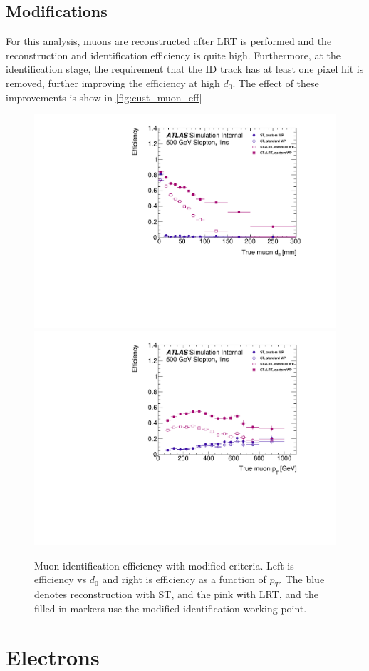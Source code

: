 \subsection{Modifications}
\label{sec:mu_reco_mods}

For this analysis, muons are reconstructed after \ac{LRT} is performed and the reconstruction and identification efficiency is quite high. Furthermore, at the identification stage, the requirement that the \ac{ID} track has at least one pixel hit is removed, further improving the efficiency at high $d_{0}$. The effect of these improvements is show in \autoref{fig:cust_muon_eff}


\begin{figure}[htbp]
\centering
\includegraphics[width=.48\textwidth]{figures/EventReconstruction/wp_m_d0_all_wip.pdf}
\includegraphics[width=.48\textwidth]{figures/EventReconstruction/wp_m_pt_all_wip.pdf}
\caption{Muon identification efficiency with modified criteria. Left is efficiency vs $d_{0}$ and right is efficiency as a function of $p_{T}$. The blue denotes reconstruction with \ac{ST}, and the pink with \ac{LRT}, and the filled in markers use the modified identification working point.}
\label{fig:cust_muon_eff}
\end{figure}



\section{Electrons}
\label{sec:elecreco}

